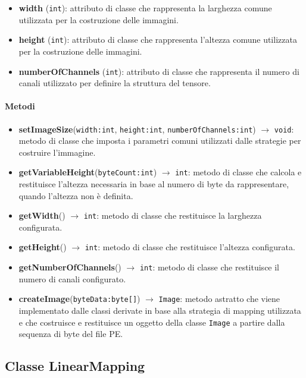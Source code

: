 \begin{itemize}
    \raggedright
    \item \textbf{width} (\texttt{int}): attributo di classe che rappresenta
    la larghezza comune utilizzata per la costruzione delle immagini.
    \item \textbf{height} (\texttt{int}): attributo di classe che rappresenta
    l’altezza comune utilizzata per la costruzione delle immagini.
    \item \textbf{numberOfChannels} (\texttt{int}): attributo di classe che
    rappresenta il numero di canali utilizzato per definire la struttura
    del tensore.
\end{itemize}

\paragraph{Metodi}

\begin{itemize}
    \raggedright
    \item \textbf{setImageSize}(\texttt{width:int}, \texttt{height:int},
    \texttt{numberOfChannels:int}) $\rightarrow$ \texttt{void}: metodo
    di classe che imposta i parametri comuni utilizzati dalle strategie per
    costruire l’immagine.
    \item \textbf{getVariableHeight}(\texttt{byteCount:int})
    $\rightarrow$ \texttt{int}: metodo di classe che calcola e restituisce
    l’altezza necessaria in base al numero di byte da rappresentare, quando
    l’altezza non è definita.
    \item \textbf{getWidth}() $\rightarrow$ \texttt{int}: metodo di classe
    che restituisce la larghezza configurata.
    \item \textbf{getHeight}() $\rightarrow$ \texttt{int}: metodo di classe
    che restituisce l’altezza configurata.
    \item \textbf{getNumberOfChannels}() $\rightarrow$ \texttt{int}: metodo 
    di classe che restituisce il numero di canali configurato.
    \item \textbf{createImage}(\texttt{byteData:byte[]}) $\rightarrow$
    \texttt{Image}: metodo astratto che viene implementato dalle classi
    derivate in base alla strategia di mapping utilizzata e che costruisce
    e restituisce un oggetto della classe \texttt{Image} a partire dalla
    sequenza di byte del file PE.
\end{itemize}

\subsection{Classe LinearMapping}

